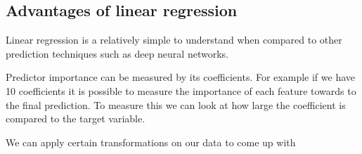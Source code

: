 \subsection*{Advantages of linear regression}

Linear regression is a relatively simple to understand when compared to other prediction techniques such as deep neural networks.

Predictor importance can be measured by its coefficients. For example if we have 10 coefficients it is possible to measure the importance of each feature towards to the final prediction. To measure this we can look at how large the coefficient is compared to the target variable.

We can apply certain transformations on our data to come up with 